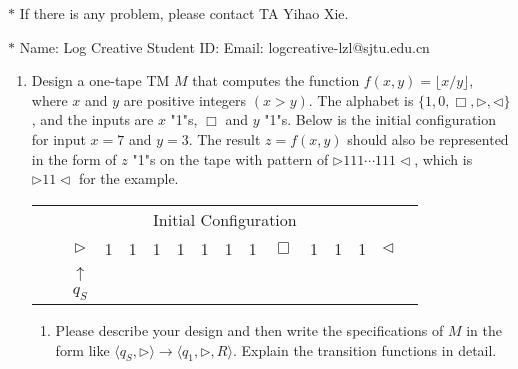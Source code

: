 \documentclass[12pt,a4paper]{article}
\theoremstyle{definition}
\begin{document}
\noindent

\noindent{}
\begin{center}
\footnotesize{\color{red}$*$ If there is any problem, please contact TA Yihao Xie. }

\footnotesize{\color{blue}$*$ Name: Log Creative  \quad Student ID:  \quad Email: logcreative-lzl@sjtu.edu.cn}
\end{center}

\begin{enumerate}
    \item Design a one-tape TM $M$ that computes the function $f(x, y) = \lfloor x/y \rfloor$, where $x$ and $y$ are positive integers $(x > y)$. The alphabet is $\{1, 0, \Box, \triangleright, \triangleleft\}$, and the inputs are $x$ "1"s, $\Box$ and $y$ "1"s. Below is the initial configuration for input $x=7$ and $y=3$. The result $z=f(x,y)$ should also be represented in the form of $z$ "1"s on the tape with pattern of $\rhd 111\cdots 111\lhd$, which is $\rhd 11\lhd$ for the example.
    
	\begin{center}
		\begin{tabular}{ll|c|c|c|c|c|c|c|c|c|c|c|c|c|c}
			& \multicolumn{14}{c}{Initial Configuration}\\[5pt]
			\cline{2-16}
			& & $\triangleright$ &  1  & 1 & 1 & 1 & 1 & 1 & 1 & $\Box$ & 1 & 1 & 1 & $ \triangleleft$ & \\
			\cline{2-16}
			\multicolumn{2}{c}{} & \multicolumn{1}{c}{$\uparrow$} & \multicolumn{11}{c}{}\\[-4px]
			\multicolumn{2}{c}{} & \multicolumn{1}{c}{$q_S$} & \multicolumn{11}{c}{}	
		\end{tabular}
	\end{center}

    \begin{enumerate}
	\item
	Please describe your design and then write the specifications of $M$ in the form like $\langle q_S, \triangleright \rangle \rightarrow \langle q_1, \triangleright,  R\rangle$. Explain the transition functions in detail.


\end{enumerate}
\end{enumerate}
\end{document}
